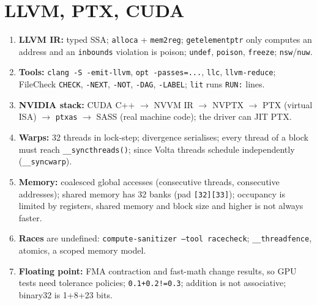 \documentclass[10pt,a4paper,openany,oneside]{report}
\begin{document}
\section*{LLVM, PTX, CUDA}
\begin{enumerate}[nosep,leftmargin=2.2em,start=20,label=\textbf{\arabic*.}]
\item \textbf{LLVM IR:} typed SSA; \texttt{alloca} + \texttt{mem2reg}; \texttt{getelementptr} only computes an address and an \texttt{inbounds} violation is poison; \texttt{undef}, \texttt{poison}, \texttt{freeze}; \texttt{nsw}/\texttt{nuw}.
\item \textbf{Tools:} \texttt{clang -S -emit-llvm}, \texttt{opt -passes=...}, \texttt{llc}, \texttt{llvm-reduce}; FileCheck \texttt{CHECK}, \texttt{-NEXT}, \texttt{-NOT}, \texttt{-DAG}, \texttt{-LABEL}; \texttt{lit} runs \texttt{RUN:} lines.
\item \textbf{NVIDIA stack:} CUDA C++ $\to$ NVVM IR $\to$ NVPTX $\to$ PTX (virtual ISA) $\to$ \texttt{ptxas} $\to$ SASS (real machine code); the driver can JIT PTX.
\item \textbf{Warps:} 32 threads in lock-step; divergence serialises; every thread of a block must reach \texttt{\_\_syncthreads()}; since Volta threads schedule independently (\texttt{\_\_syncwarp}).
\item \textbf{Memory:} coalesced global accesses (consecutive threads, consecutive addresses); shared memory has 32 banks (pad \texttt{[32][33]}); occupancy is limited by registers, shared memory and block size and higher is not always faster.
\item \textbf{Races} are undefined: \texttt{compute-sanitizer --tool racecheck}; \texttt{\_\_threadfence}, atomics, a scoped memory model.
\item \textbf{Floating point:} FMA contraction and fast-math change results, so GPU tests need tolerance policies; \texttt{0.1+0.2!=0.3}; addition is not associative; binary32 is 1+8+23 bits.
\end{enumerate}
\end{document}
